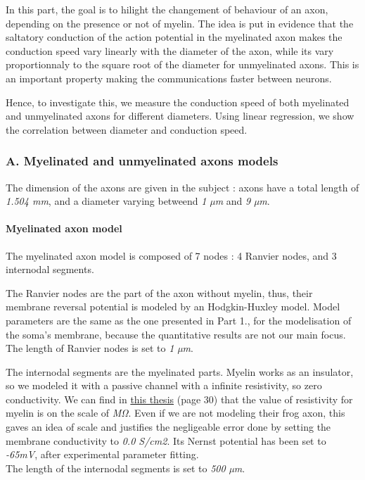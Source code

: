 \documentclass[]{article}
\let\oldparagraph\paragraph
\renewcommand{\paragraph}[1]{\oldparagraph{#1}\mbox{}}
\begin{document}
In this part, the goal is to hilight the changement of behaviour of an
axon, depending on the presence or not of myelin. The idea is put in
evidence that the saltatory conduction of the action potential in the
myelinated axon makes the conduction speed vary linearly with the
diameter of the axon, while its vary proportionnaly to the square root
of the diameter for unmyelinated axons. This is an important property
making the communications faster between neurons.

Hence, to investigate this, we measure the conduction speed of both
myelinated and unmyelinated axons for different diameters. Using linear
regression, we show the correlation between diameter and conduction
speed.

\hypertarget{a.-myelinated-and-unmyelinated-axons-models}{%
\subsubsection{A. Myelinated and unmyelinated axons
models}\label{a.-myelinated-and-unmyelinated-axons-models}}

The dimension of the axons are given in the subject : axons have a total
length of \emph{1.504 mm}, and a diameter varying betweend \emph{1 µm}
and \emph{9 µm}.

\hypertarget{myelinated-axon-model}{%
\paragraph{Myelinated axon model}\label{myelinated-axon-model}}

The myelinated axon model is composed of 7 nodes : 4 Ranvier nodes, and
3 internodal segments.

The Ranvier nodes are the part of the axon without myelin, thus, their
membrane reversal potential is modeled by an Hodgkin-Huxley model. Model
parameters are the same as the one presented in Part 1., for the
modelisation of the soma's membrane, because the quantitative results
are not our main focus. The length of Ranvier nodes is set to \emph{1
µm}.

The internodal segments are the myelinated parts. Myelin works as an
insulator, so we modeled it with a passive channel with a infinite
resistivity, so zero conductivity. We can find in
\href{https://pdfs.semanticscholar.org/a622/57ca2a4024a2165cad8384df388f16208f31.pdf}{this
thesis} (page 30) that the value of resistivity for myelin is on the
scale of \emph{MΩ}. Even if we are not modeling their frog axon, this
gaves an idea of scale and justifies the negligeable error done by
setting the membrane conductivity to \emph{0.0 S/cm2}. Its Nernst
potential has been set to \emph{-65mV}, after experimental parameter
fitting.\\
The length of the internodal segments is set to \emph{500 µm}.
\end{document}
